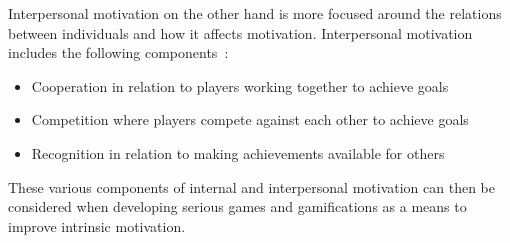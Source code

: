 Interpersonal motivation on the other hand is more focused around the relations between individuals and how it affects motivation. Interpersonal motivation includes the following components~\cite{maloneTax, mozelius2014game}:

\begin{itemize}
    \item Cooperation in relation to players working together to achieve goals
    \item Competition where players compete against each other to achieve goals
    \item Recognition in relation to making achievements available for others
\end{itemize}

These various components of internal and interpersonal motivation can then be considered when developing serious games and gamifications as a means to improve intrinsic motivation.